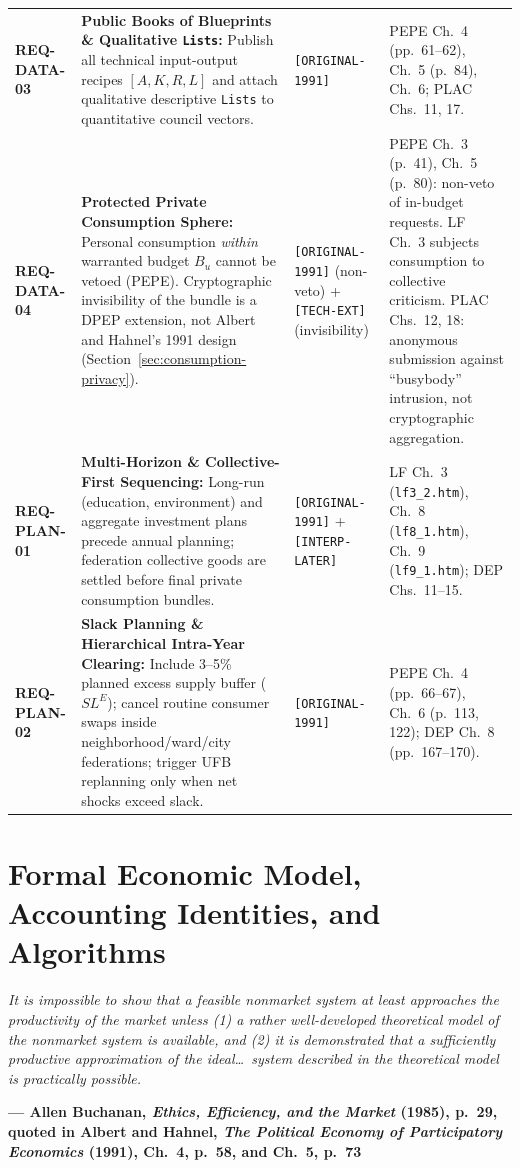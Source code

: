 \documentclass[10pt,twoside,openany]{book}
\theoremstyle{dpepstyle}
\newcommand{\chapterepigraph}[2]{%
  \vspace{-0.4em}
  \begin{FlushRight}
  \begin{minipage}{0.82\textwidth}
    \itshape\small\color{SlateDark} #1\par
    \vspace{3pt}
    \upshape\footnotesize\textbf{--- #2}
  \end{minipage}
  \end{FlushRight}
  \vspace{1em}
}
\newenvironment{FlushRight}{\begin{flushright}}{\end{flushright}}
\begin{document}
{\begin{longtable}{L{0.78in} L{1.95in} L{0.82in} L{0.95in}}
\addlinespace[3pt]
\textbf{REQ-DATA-03} & \textbf{Public Books of Blueprints \& Qualitative \texttt{Lists}:} Publish all technical input-output recipes $[A,K,R,L]$ and attach qualitative descriptive \texttt{Lists} to quantitative council vectors. & \texttt{[ORIGINAL-1991]} & PEPE Ch.~4 (pp.~61--62), Ch.~5 (p.~84), Ch.~6; PLAC Chs.~11, 17. \\
\addlinespace[3pt]
\textbf{REQ-DATA-04} & \textbf{Protected Private Consumption Sphere:} Personal consumption \emph{within} warranted budget $B_u$ cannot be vetoed (PEPE). Cryptographic invisibility of the bundle is a DPEP extension, not Albert and Hahnel's 1991 design (Section~\ref{sec:consumption-privacy}). & \texttt{[ORIGINAL-1991]} (non-veto) + \texttt{[TECH-EXT]} (invisibility) & PEPE Ch.~3 (p.~41), Ch.~5 (p.~80): non-veto of in-budget requests. LF Ch.~3 subjects consumption to collective criticism. PLAC Chs.~12, 18: anonymous submission against ``busybody'' intrusion, not cryptographic aggregation. \\
\addlinespace[3pt]
\textbf{REQ-PLAN-01} & \textbf{Multi-Horizon \& Collective-First Sequencing:} Long-run (education, environment) and aggregate investment plans precede annual planning; federation collective goods are settled before final private consumption bundles. & \texttt{[ORIGINAL-1991]} + \texttt{[INTERP-LATER]} & LF Ch.~3 (\texttt{lf3\_2.htm}), Ch.~8 (\texttt{lf8\_1.htm}), Ch.~9 (\texttt{lf9\_1.htm}); DEP Chs.~11--15. \\
\addlinespace[3pt]
\textbf{REQ-PLAN-02} & \textbf{Slack Planning \& Hierarchical Intra-Year Clearing:} Include 3--5\% planned excess supply buffer ($SL^E$); cancel routine consumer swaps inside neighborhood/ward/city federations; trigger UFB replanning only when net shocks exceed slack. & \texttt{[ORIGINAL-1991]} & PEPE Ch.~4 (pp.~66--67), Ch.~6 (p.~113, 122); DEP Ch.~8 (pp.~167--170). \\
\end{longtable}}

\chapter{Formal Economic Model, Accounting Identities, and Algorithms}
\label{ch:model}

\chapterepigraph{It is impossible to show that a feasible nonmarket system at least approaches the productivity of the market unless (1) a rather well-developed theoretical model of the nonmarket system is available, and (2) it is demonstrated that a sufficiently productive approximation of the ideal\dots\ system described in the theoretical model is practically possible.}{Allen Buchanan, \emph{Ethics, Efficiency, and the Market} (1985), p.~29, quoted in Albert and Hahnel, \emph{The Political Economy of Participatory Economics} (1991), Ch.~4, p.~58, and Ch.~5, p.~73\protect\footnotemark}
\end{document}
